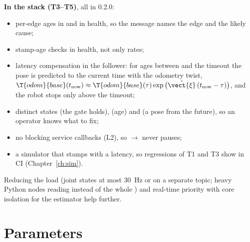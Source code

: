 \textbf{In the stack (T3--T5)}, all in 0.2.0:
\begin{itemize}
  \item per-edge ages in  and in health, so the message names the edge and the likely
    cause;
  \item stamp-age checks in health, not only rates;
  \item latency compensation in the follower: for ages between 
    and the timeout the pose is predicted to the current time with the odometry twist,
    $\T{odom}{base}(t_{\mathrm{now}}) \approx \T{odom}{base}(\tau)\exp\big(\hat{\vect{\xi}}\,
    (t_{\mathrm{now}} - \tau)\big)$, and the robot stops only above the timeout;
  \item distinct states  (the gate holds),  (age) and
     (a pose from the future), so an operator knows what to fix;
  \item no blocking service callbacks (L2), so $\to$ never pauses;
  \item a simulator that stamps with a latency, so regressions of T1 and T3 show in CI
    (Chapter~\ref{ch:sim}).
\end{itemize}
Reducing the  load (joint states at most 30~Hz or on a separate topic; heavy Python
nodes reading  instead of the whole ) and real-time priority
with core isolation for the estimator help further.

\section{Parameters}

\readonlynote


